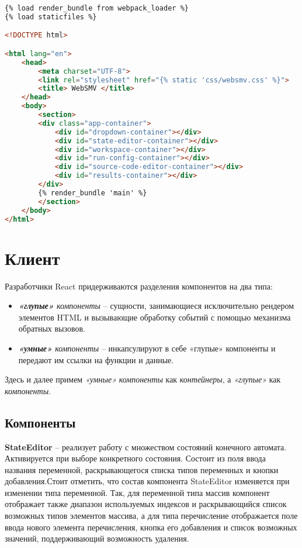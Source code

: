 \begin{lstlisting}[language=HTML, 
				   label=lst:template, 
				   caption={Файл main.html -- шаблон страницы.}]
{% load render_bundle from webpack_loader %}
{% load staticfiles %}

<!DOCTYPE html>

<html lang="en">
	<head>
		<meta charset="UTF-8">
		<link rel="stylesheet" href="{% static 'css/websmv.css' %}">
		<title> WebSMV </title>
	</head>
	<body>
		<section>
		<div class="app-container">
			<div id="dropdown-container"></div>
			<div id="state-editor-container"></div>
			<div id="workspace-container"></div>
			<div id="run-config-container"></div>
			<div id="source-code-editor-container"></div>
			<div id="results-container"></div>
		</div>
		{% render_bundle 'main' %}
		</section>
	</body>
</html>
\end{lstlisting}

\section{Клиент}\label{sec:client}

Разработчики React придерживаются разделения компонентов на два типа:

\begin{itemize}
	\item \textit{\textbf{«глупые»} компоненты} -- сущности, занимающиеся исключительно рендером элементов HTML и вызывающие обработку событий с помощью механизма обратных вызовов.
	\item \textit{\textbf{«умные»} компоненты} -- инкапсулируют в себе «глупые» компоненты и передают им ссылки на функции и данные.
\end{itemize}

Здесь и далее примем \textit{«умные»} \textit{компоненты} как \textit{контейнеры}, а \textit{«глупые»} как \textit{компоненты}.

\subsection{Компоненты}

\textbf{StateEditor} -- реализует работу с множеством состояний конечного автомата. Активируется при выборе конкретного состояния. Состоит из поля ввода названия переменной, раскрывающегося списка типов переменных и кнопки добавления.Стоит отметить, что состав компонента StateEditor изменяется при изменении типа переменной. Так, для переменной типа массив компонент отображает также диапазон используемых индексов и раскрывающийся список возможных типов элементов массива, а для типа перечисление отображается поле ввода нового элемента перечисления, кнопка его добавления и список возможных значений, поддерживающий возможность удаления.

